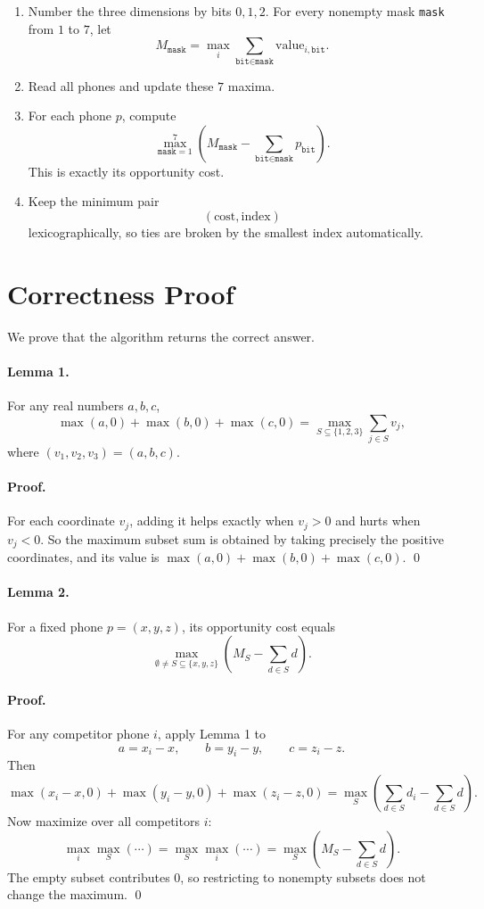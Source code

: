 \documentclass[11pt]{article}
\begin{document}
\begin{enumerate}[leftmargin=*]
    \item Number the three dimensions by bits $0,1,2$.
    For every nonempty mask \texttt{mask} from $1$ to $7$, let
    \[
        M_{\texttt{mask}} = \max_i \sum_{\texttt{bit} \in \texttt{mask}} \text{value}_{i,\texttt{bit}}.
    \]
    \item Read all phones and update these $7$ maxima.
    \item For each phone $p$, compute
    \[
        \max_{\texttt{mask}=1}^{7}
        \left( M_{\texttt{mask}} - \sum_{\texttt{bit} \in \texttt{mask}} p_{\texttt{bit}} \right).
    \]
    This is exactly its opportunity cost.
    \item Keep the minimum pair
    \[
        (\text{cost}, \text{index})
    \]
    lexicographically, so ties are broken by the smallest index automatically.
\end{enumerate}

\section*{Correctness Proof}

We prove that the algorithm returns the correct answer.

\paragraph{Lemma 1.}
For any real numbers $a,b,c$,
\[
    \max(a,0)+\max(b,0)+\max(c,0)
    =
    \max_{S \subseteq \{1,2,3\}} \sum_{j \in S} v_j,
\]
where $(v_1,v_2,v_3)=(a,b,c)$.

\paragraph{Proof.}
For each coordinate $v_j$, adding it helps exactly when $v_j > 0$ and hurts when $v_j < 0$.
So the maximum subset sum is obtained by taking precisely the positive coordinates, and its value is
$\max(a,0)+\max(b,0)+\max(c,0)$. \qed

\paragraph{Lemma 2.}
For a fixed phone $p=(x,y,z)$, its opportunity cost equals
\[
    \max_{\emptyset \ne S \subseteq \{x,y,z\}}
    \left( M_S - \sum_{d \in S} d \right).
\]

\paragraph{Proof.}
For any competitor phone $i$, apply Lemma 1 to
\[
    a = x_i-x,\qquad b = y_i-y,\qquad c = z_i-z.
\]
Then
\[
    \max(x_i-x,0)+\max(y_i-y,0)+\max(z_i-z,0)
    =
    \max_S \left( \sum_{d \in S} d_i - \sum_{d \in S} d \right).
\]
Now maximize over all competitors $i$:
\[
    \max_i \max_S (\cdots)
    =
    \max_S \max_i (\cdots)
    =
    \max_S \left( M_S - \sum_{d \in S} d \right).
\]
The empty subset contributes $0$, so restricting to nonempty subsets does not change the maximum. \qed
\end{document}
